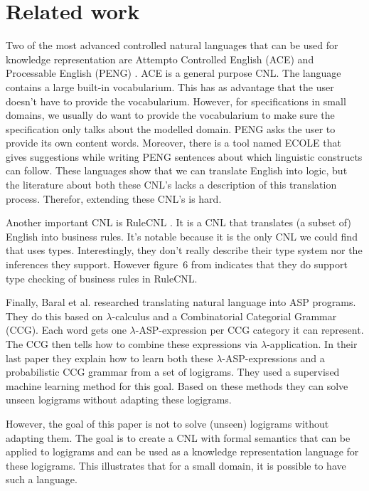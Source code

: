 \section{Related work}

Two of the most advanced controlled natural languages that can be used for knowledge representation are Attempto Controlled English (ACE) \cite{Fuchs2008} and Processable English (PENG) \cite{Schwitter2002}. ACE is a general purpose CNL. The language contains a large built-in vocabularium. This has as advantage that the user doesn't have to provide the vocabularium. However, for specifications in small domains, we usually do want to provide the vocabularium to make sure the specification only talks about the modelled domain. PENG asks the user to provide its own content words. Moreover, there is a tool named ECOLE that gives suggestions while writing PENG sentences about which linguistic constructs can follow. These languages show that we can translate English into logic, but the literature about both these CNL's lacks a description of this translation process. Therefor, extending these CNL's is hard.

Another important CNL is RuleCNL \cite{Njonko2014}. It is a CNL that translates (a subset of) English into business rules. It's notable because it is the only CNL we could find that uses types. Interestingly, they don't really describe their type system nor the inferences they support. However figure~6 from \cite{Njonko2014} indicates that they do support type checking of business rules in RuleCNL.

Finally, Baral et al. \cite{Baral2008, Costantini2010, Baral2012, Baral2012a} researched translating natural language into ASP programs. They do this based on $\lambda$-calculus and a Combinatorial Categorial Grammar (CCG). Each word gets one $\lambda$-ASP-expression per CCG category it can represent. The CCG then tells how to combine these expressions via $\lambda$-application. In their last paper \cite{Baral2012a} they explain how to learn both these $\lambda$-ASP-expressions and a probabilistic CCG grammar from a set of logigrams. They used a supervised machine learning method for this goal. Based on these methods they can solve unseen logigrams without adapting these logigrams.

However, the goal of this paper is not to solve (unseen) logigrams without adapting them. The goal is to create a CNL with formal semantics that can be applied to logigrams and can be used as a knowledge representation language for these logigrams. This illustrates that for a small domain, it is possible to have such a language.
